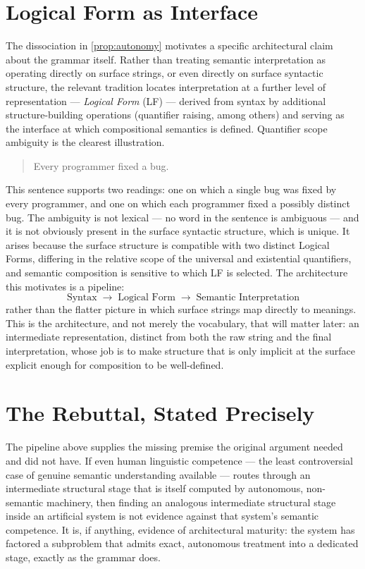 \documentclass[11pt]{book}
\theoremstyle{plain}
\theoremstyle{definition}
\theoremstyle{remark}
\begin{document}
\section{Logical Form as Interface}

The dissociation in \cref{prop:autonomy} motivates a specific
architectural claim about the grammar itself. Rather than treating
semantic interpretation as operating directly on surface strings, or
even directly on surface syntactic structure, the relevant tradition
locates interpretation at a further level of representation ---
\emph{Logical Form} (LF) --- derived from syntax by additional
structure-building operations (quantifier raising, among others) and
serving as the interface at which compositional semantics is defined.
Quantifier scope ambiguity is the clearest illustration.

\begin{quote}
Every programmer fixed a bug.
\end{quote}

\noindent This sentence supports two readings: one on which a single
bug was fixed by every programmer, and one on which each programmer
fixed a possibly distinct bug. The ambiguity is not lexical --- no
word in the sentence is ambiguous --- and it is not obviously present
in the surface syntactic structure, which is unique. It arises because
the surface structure is compatible with two distinct Logical Forms,
differing in the relative scope of the universal and existential
quantifiers, and semantic composition is sensitive to which LF is
selected. The architecture this motivates is a pipeline:
\[
\text{Syntax} \;\longrightarrow\; \text{Logical Form} \;\longrightarrow\; \text{Semantic Interpretation}
\]
rather than the flatter picture in which surface strings map directly
to meanings. This is the architecture, and not merely the vocabulary,
that will matter later: an intermediate representation, distinct from
both the raw string and the final interpretation, whose job is to make
structure that is only implicit at the surface explicit enough for
composition to be well-defined.

\section{The Rebuttal, Stated Precisely}

The pipeline above supplies the missing premise the original argument
needed and did not have. If even human linguistic competence --- the
least controversial case of genuine semantic understanding available
--- routes through an intermediate structural stage that is itself
computed by autonomous, non-semantic machinery, then finding an
analogous intermediate structural stage inside an artificial system is
not evidence against that system's semantic competence. It is,
if anything, evidence of architectural maturity: the system has
factored a subproblem that admits exact, autonomous treatment into a
dedicated stage, exactly as the grammar does.
\end{document}

